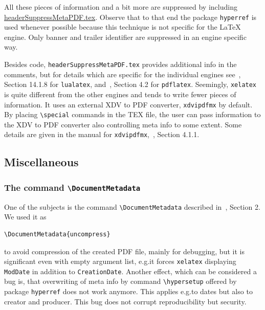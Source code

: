 \documentclass[a4paper]{article}%
\newcommand{\pdflatex}{\texttt{pdflatex}}
\newcommand{\lualatex}{\texttt{lualatex}}
\newcommand{\xelatex}{\texttt{xelatex}}
\newcommand{\cmd}[1]{\texttt{\textbackslash#1}}
\begin{document}
\begin{description}
\end{description}

All these pieces of information 
and a bit more are suppressed 
by including \href{\urlSite fromTex/headerSuppressMetaPDF.tex}{headerSuppressMetaPDF.tex}. 
Observe that to that end the package \texttt{hyperref} is used 
whenever possible because this technique is not specific for the \LaTeX{} engine. 
Only banner and trailer identifier are suppressed in an engine specific way. 

Besides code, \texttt{headerSuppressMetaPDF.tex} provides 
additional info in the comments, 
but for details which are specific for the individual engines 
see~\cite{LuaTexRef25}, Section 14.1.8 for \lualatex, 
and~\cite{PdfTexUsr25}, Section 4.2 for \pdflatex. 
Seemingly, \xelatex{} is quite different from the other engines 
and tends to write fewer pieces of information. 
It uses an external XDV to PDF converter, \texttt{xdvipdfmx} by default. 
By placing \cmd{special} commands in the TEX file, 
the user can pass information to the XDV to PDF converter 
also controlling meta info to some extent. 
Some details are given in the 
manual for \texttt{xdvipdfmx},~\cite{DviPdfMx}, Section 4.1.1. 



\subsection{Miscellaneous}\label{subsec:misc}

\subsubsection{The command \cmd{DocumentMetadata}}\label{subsubsec:docMeta}

One of the subjects is the command \cmd{DocumentMetadata} 
described in~\cite{DocMetaDataSuppCode}, Section 2. 
We used it as 
%
\begin{verbatim}
\DocumentMetadata{uncompress}
\end{verbatim}
%
to avoid compression of the created PDF file, mainly for debugging, 
but it is significant even with empty argument list, 
e.g.\@ it forces \xelatex{} displaying \texttt{ModDate} in addition to \texttt{CreationDate}. 
Another effect, which can be considered a bug is, 
that overwriting of meta info by command \cmd{hypersetup} offered by package \texttt{hyperref} 
does not work anymore. 
This applies e.g.\@ to dates but also to creator and producer. 
This bug does not corrupt reproducibility but security. 
\end{document}
